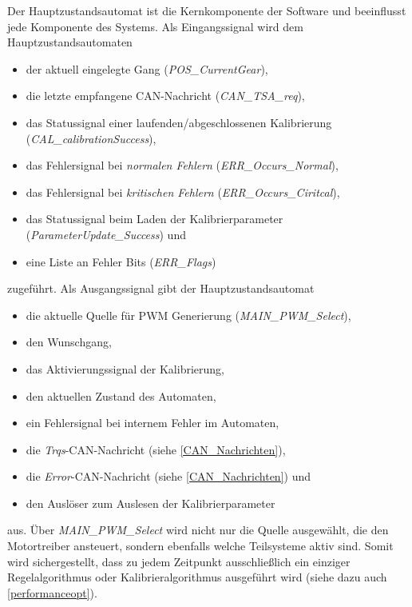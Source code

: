 Der Hauptzustandsautomat ist die Kernkomponente der Software und beeinflusst jede Komponente des Systems. Als Eingangssignal wird dem Hauptzustandsautomaten
\begin{itemize}
	\item der aktuell eingelegte Gang (\textit{POS\_CurrentGear}),
	\item die letzte empfangene CAN-Nachricht (\textit{CAN\_TSA\_req}),
	\item das Statussignal einer laufenden/abgeschlossenen Kalibrierung (\textit{CAL\_calibrationSuccess}),
	\item das Fehlersignal bei \textit{normalen Fehlern} (\textit{ERR\_Occurs\_Normal}),
	\item das Fehlersignal bei \textit{kritischen Fehlern} (\textit{ERR\_Occurs\_Ciritcal}),
	\item das Statussignal beim Laden der Kalibrierparameter (\textit{ParameterUpdate\_Success}) und
	\item eine Liste an Fehler Bits (\textit{ERR\_Flags})
\end{itemize}
zugeführt. Als Ausgangssignal gibt der Hauptzustandsautomat
\begin{itemize}
	\item die aktuelle Quelle für PWM Generierung (\textit{MAIN\_PWM\_Select}),
	\item den Wunschgang,
	\item das Aktivierungssignal der Kalibrierung,
	\item den aktuellen Zustand des Automaten,
	\item ein Fehlersignal bei internem Fehler im Automaten,
	\item die \textit{Trqs}-CAN-Nachricht (siehe \autoref{CAN_Nachrichten}),
	\item die \textit{Error}-CAN-Nachricht (siehe \autoref{CAN_Nachrichten}) und
	\item den Auslöser zum Auslesen der Kalibrierparameter
\end{itemize}
aus. Über \textit{MAIN\_PWM\_Select} wird nicht nur die Quelle ausgewählt, die den Motortreiber ansteuert, sondern ebenfalls welche Teilsysteme aktiv sind. Somit wird sichergestellt, dass zu jedem Zeitpunkt ausschließlich ein einziger Regelalgorithmus oder Kalibrieralgorithmus ausgeführt wird (siehe dazu auch \autoref{performanceopt}).\\
